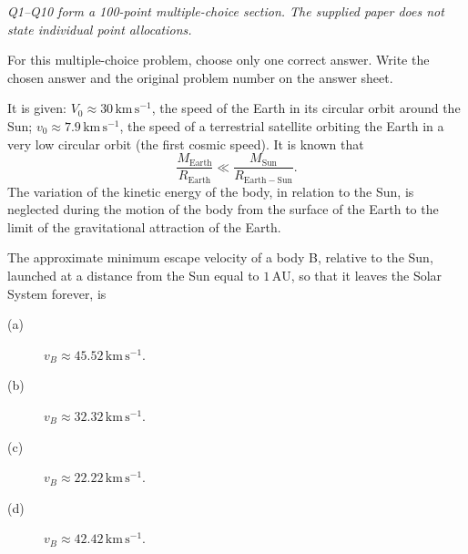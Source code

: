 \textit{Q1--Q10 form a 100-point multiple-choice section. The supplied paper
does not state individual point allocations.}

For this multiple-choice problem, choose only one correct answer. Write the
chosen answer and the original problem number on the answer sheet.

It is given: $V_0\approx30\,\mathrm{km\,s^{-1}}$, the speed of the Earth in
its circular orbit around the Sun; $v_0\approx7.9\,\mathrm{km\,s^{-1}}$,
the speed of a terrestrial satellite orbiting the Earth in a very low
circular orbit (the first cosmic speed).
It is known that
\[\frac{M_{\mathrm{Earth}}}{R_{\mathrm{Earth}}}\ll
  \frac{M_{\mathrm{Sun}}}{R_{\mathrm{Earth-Sun}}}.\]
The variation of the kinetic energy of the body, in relation to the Sun, is
neglected during the motion of the body from the surface of the Earth to
the limit of the gravitational attraction of the Earth.

The approximate minimum escape velocity of a body B, relative to the Sun,
launched at a distance from the Sun equal to $1\,\mathrm{AU}$, so that it
leaves the Solar System forever, is
\begin{description}
\item[(a)] $v_B\approx45.52\,\mathrm{km\,s^{-1}}$.
\item[(b)] $v_B\approx32.32\,\mathrm{km\,s^{-1}}$.
\item[(c)] $v_B\approx22.22\,\mathrm{km\,s^{-1}}$.
\item[(d)] $v_B\approx42.42\,\mathrm{km\,s^{-1}}$.
\end{description}
